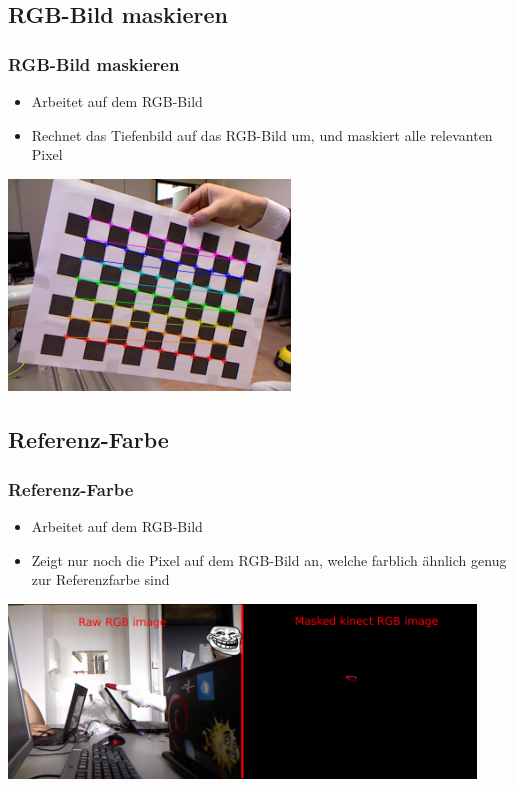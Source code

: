 \documentclass[compress]{beamer}
\begin{document}
\subsection{RGB-Bild maskieren}
\begin{frame}
\frametitle{RGB-Bild maskieren}
\begin{itemize}
	\item Arbeitet auf dem RGB-Bild
	\item Rechnet das Tiefenbild auf das RGB-Bild um, und maskiert alle relevanten Pixel
\end{itemize}

\hspace*{2.2cm}\includegraphics[width=7.5cm]{trans.png}
\end{frame}

\subsection{Referenz-Farbe}
\begin{frame}
\frametitle{Referenz-Farbe}
\begin{itemize}
	\item Arbeitet auf dem RGB-Bild
	\item Zeigt nur noch die Pixel auf dem RGB-Bild an, welche farblich ähnlich genug zur Referenzfarbe sind
\end{itemize}

\includegraphics[width=12.4cm]{filter4.png}
\end{frame}
\end{document}

